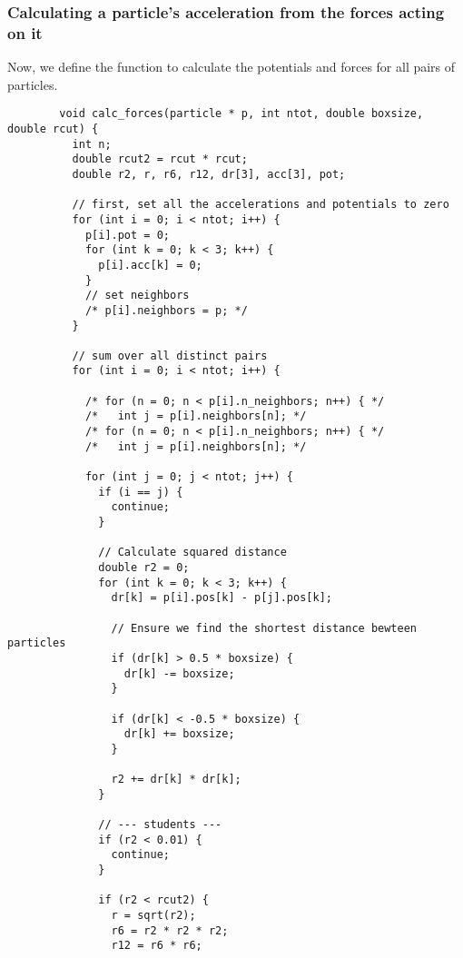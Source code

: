 \subsubsection{Calculating a particle's acceleration from the 
    forces acting on it
}
    Now, we define the function to calculate the potentials and forces for all 
    pairs of particles. \\
    \begin{lstlisting}
        void calc_forces(particle * p, int ntot, double boxsize, double rcut) {
          int n;
          double rcut2 = rcut * rcut;
          double r2, r, r6, r12, dr[3], acc[3], pot;
        
          // first, set all the accelerations and potentials to zero
          for (int i = 0; i < ntot; i++) {
            p[i].pot = 0;
            for (int k = 0; k < 3; k++) {
              p[i].acc[k] = 0;
            }
            // set neighbors
            /* p[i].neighbors = p; */
          }
        
          // sum over all distinct pairs
          for (int i = 0; i < ntot; i++) {

            /* for (n = 0; n < p[i].n_neighbors; n++) { */
            /*   int j = p[i].neighbors[n]; */
            /* for (n = 0; n < p[i].n_neighbors; n++) { */
            /*   int j = p[i].neighbors[n]; */

            for (int j = 0; j < ntot; j++) {
              if (i == j) {
                continue;
              }
        
              // Calculate squared distance
              double r2 = 0;
              for (int k = 0; k < 3; k++) {
                dr[k] = p[i].pos[k] - p[j].pos[k];
        
                // Ensure we find the shortest distance bewteen particles
                if (dr[k] > 0.5 * boxsize) {
                  dr[k] -= boxsize;
                }
        
                if (dr[k] < -0.5 * boxsize) {
                  dr[k] += boxsize;
                }
        
                r2 += dr[k] * dr[k];
              }
        
              // --- students ---
              if (r2 < 0.01) {
                continue;
              }
        
              if (r2 < rcut2) {
                r = sqrt(r2);
                r6 = r2 * r2 * r2;
                r12 = r6 * r6;
        

\end{lstlisting}
